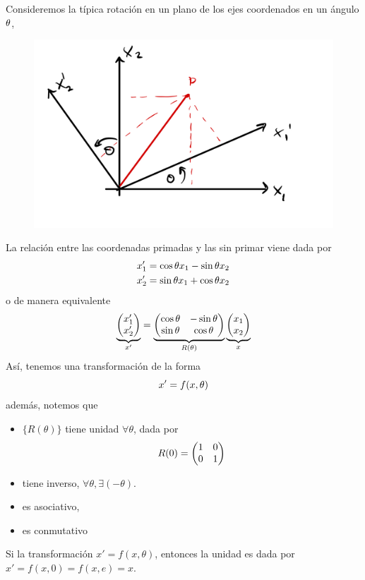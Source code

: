 \begin{ej}
Consideremos la típica rotación en un plano de los ejes coordenados en un ángulo $\theta$,
	\begin{figure}[h!]
		\centering
		\includegraphics[scale=0.15]{sistema-coord.jpeg}
	\end{figure}
La relación entre las coordenadas primadas y las sin primar viene dada por
\begin{align}
  x'_1&=\cos\theta x_1-\sin\theta x_2\\
  x'_2&=\sin\theta x_1+\cos\theta x_2
\end{align}
o de manera equivalente
\begin{equation}
  \underbrace{\mqty(x_1'\\x'_2)}_{x'}=\underbrace{\mqty(\cos\th&-\sin\th\\\sin\th&\cos\th)}_{R(\th)}\underbrace{\mqty(x_1\\x_2)}_{x}
\end{equation}
Así, tenemos una transformación de la forma 
\begin{equation}
  x'=f(x,\theta )
\end{equation}
además, notemos que 
\begin{itemize}
\item $\{R(\theta)\}$ tiene unidad $\forall \theta$, dada por
\begin{equation}
  R(0)=\mqty(1&0\\0&1)
\end{equation}
\item tiene inverso, $\forall\theta, \exists (-\theta)$.
\item es asociativo,
\item es conmutativo
\end{itemize}
Si la transformación $x'=f(x,\theta)$, entonces la unidad es dada por $x'=f(x,0)=f(x,e)=x$.
\end{ej}

